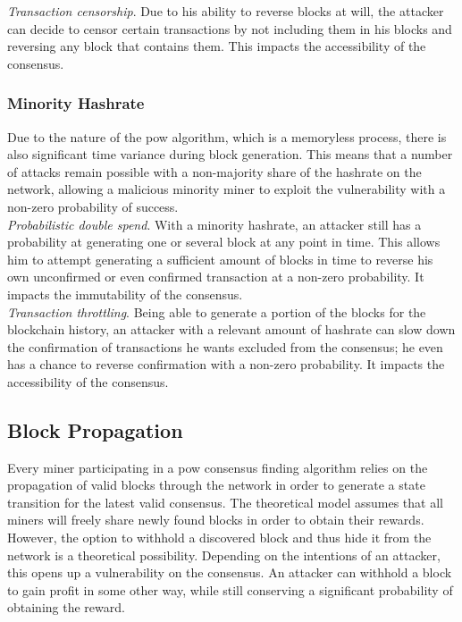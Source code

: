 \documentclass[12pt,a4paper]{article}
\begin{document}
\textit{Transaction censorship}. Due to his ability to reverse blocks at will, the attacker can decide to censor certain transactions by not including them in his blocks and reversing any block that contains them. This impacts the accessibility of the \gls{consensus}.

\subsubsection{Minority Hashrate}

Due to the nature of the \acrshort{pow} algorithm, which is a memoryless process, there is also significant time variance during block generation. This means that a number of attacks remain possible with a non-majority share of the \gls{hashrate} on the network, allowing a malicious minority miner to exploit the vulnerability with a non-zero probability of success.\\

\textit{Probabilistic double spend}. With a minority \gls{hashrate}, an attacker still has a probability at generating one or several block at any point in time. This allows him to attempt generating a sufficient amount of blocks in time to reverse his own unconfirmed or even confirmed transaction at a non-zero probability. It impacts the immutability of the \gls{consensus}.\\

\textit{Transaction throttling}. Being able to generate a portion of the blocks for the blockchain history, an attacker with a relevant amount of \gls{hashrate} can slow down the confirmation of transactions he wants excluded from the \gls{consensus}; he even has a chance to reverse confirmation with a non-zero probability. It impacts the accessibility of the \gls{consensus}.\\

\subsection{Block Propagation}

Every miner participating in a \gls{pow} consensus finding algorithm relies on the propagation of valid blocks through the network in order to generate a state transition for the latest valid \gls{consensus}. The theoretical model assumes that all miners will freely share newly found blocks in order to obtain their \glspl{reward}.\\

However, the option to withhold a discovered block and thus hide it from the network is a theoretical possibility. Depending on the intentions of an attacker, this opens up a vulnerability on the \gls{consensus}. An attacker can withhold a block to gain profit in some other way, while still conserving a significant probability of obtaining the \gls{reward}.\\
\end{document}
